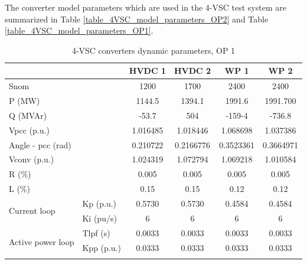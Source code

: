 \documentclass{report}
\begin{document}
The converter model parameters which are used in the 4-VSC test system are summarized in Table \ref{table_4VSC_model_parameters_OP2} and Table \ref{table_4VSC_model_parameters_OP1}.
\begin{table}[H]
\centering
\caption{4-VSC converters dynamic parameters, OP 1}
\begin{tabular}{ll|c|c|c|c}
\multicolumn{2}{l|}{}                                                  & HVDC 1    & HVDC 2    & WP 1      & WP 2      \\ \hline
\multicolumn{2}{l|}{Snom}                                              & 1200      & 1700      & 2400      & 2400      \\ \hline
\multicolumn{2}{l|}{P (MW)}                                            & 1144.5 & 1394.1   & 1991.6  & 1991.700  \\ \hline
\multicolumn{2}{l|}{Q (MVAr)}                                          & -53.7 & 504  & -159-4 & -736.8 \\ \hline
\multicolumn{2}{l|}{Vpcc (p.u.)}                                              & 1.016485  & 1.018446  & 1.068698  & 1.037386 \\ \hline
\multicolumn{2}{l|}{Angle - pcc (rad)}                                 &   0.210722        & 0.2166776           &    0.3523361       &   0.3664971         \\ \hline
\multicolumn{2}{l|}{Vconv (p.u.)}                                      & 1.024319  & 1.072794  & 1.069218  & 1.010584  \\ \hline
\multicolumn{2}{l|}{R (\%)}                                                 & 0.005     & 0.005     & 0.005     & 0.005     \\ \hline
\multicolumn{2}{l|}{L (\%)}                                                 & 0.15      & 0.15      & 0.12      & 0.12      \\ \hline
\multicolumn{1}{l|}{\multirow{2}{*}{Current loop}}        & Kp (p.u.)        & 0.5730    & 0.5730    & 0.4584    & 0.4584    \\ \cline{2-6} 
\multicolumn{1}{l|}{}                                     & Ki (pu/s)        & 6         & 6         & 6         & 6         \\ \hline
\multicolumn{1}{l|}{\multirow{6}{*}{Active power loop}}   & Tlpf (s)      & 0.0033    & 0.0033    & 0.0033    & 0.0033    \\ \cline{2-6} 
\multicolumn{1}{l|}{}                                     & Kpp (p.u.)       & 0.0333    & 0.0333    & 0.0333    & 0.0333    \\ \cline{2-6} 

\end{tabular}
\end{table}
\end{document}
